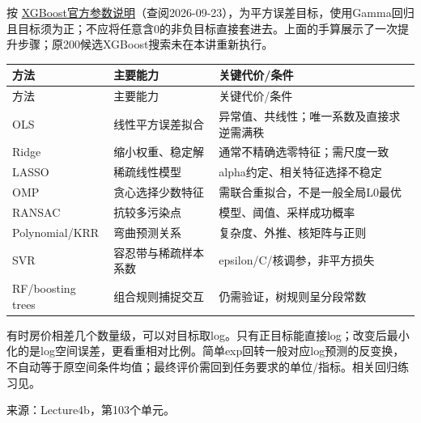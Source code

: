 按 \href{https://xgboost.readthedocs.io/en/stable/parameter.html\#learning-task-parameters}{XGBoost官方参数说明}（查阅2026-09-23），为平方误差目标，使用Gamma回归且目标须为正；不应将任意含0的非负目标直接套进去。上面的手算展示了一次提升步骤；原200候选XGBoost搜索未在本讲重新执行。





\begingroup
\small\setlength{\tabcolsep}{3pt}
\renewcommand{\arraystretch}{1.22}
\begin{longtable}{@{}>{\raggedright\arraybackslash}p{}>{\raggedright\arraybackslash}p{}>{\raggedright\arraybackslash}p{}@{}}
\toprule
方法 & 主要能力 & 关键代价/条件 \\
\midrule\endfirsthead
方法 & 主要能力 & 关键代价/条件 \\
\midrule\endhead
\bottomrule\endfoot
OLS & 线性平方误差拟合 & 异常值、共线性；唯一系数及直接求逆需满秩 \\
Ridge & 缩小权重、稳定解 & 通常不精确选零特征；需尺度一致 \\
LASSO & 稀疏线性模型 & alpha约定、相关特征选择不稳定 \\
OMP & 贪心选择少数特征 & 需联合重拟合，不是一般全局L0最优 \\
RANSAC & 抗较多污染点 & 模型、阈值、采样成功概率 \\
Polynomial/KRR & 弯曲预测关系 & 复杂度、外推、核矩阵与正则 \\
SVR & 容忍带与稀疏样本系数 & epsilon/C/核调参，非平方损失 \\
RF/boosting trees & 组合规则捕捉交互 & 仍需验证，树规则呈分段常数 \\
\end{longtable}
\endgroup


有时房价相差几个数量级，可以对目标取log。只有正目标能直接log；改变后最小化的是log空间误差，更看重相对比例。简单exp回转一般对应log预测的反变换，不自动等于原空间条件均值；最终评价需回到任务要求的单位/指标。相关回归练习见。


来源：Lecture4b，第103个单元。






